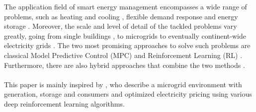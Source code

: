 The application field of smart energy management encompasses a wide range of problems, such as heating  and cooling \cite{Blum.2021}\cite{ThomasSchreiber.2020}, flexible demand response \cite{Jin.2021} and energy storage \cite{Nakabi.2021}. Moreover, the scale and level of detail of the tackled problems vary greatly, going from single buildings \cite{Blum.2021}, to microgrids \cite{Nakabi.2021} \cite{Castellanos.04.12.2022} to eventually continent-wide electricity grids \cite{Horsch.2018}. The two most promising approaches to solve such problems are classical Model Predictive Control (MPC) \cite{Basantes.2023} and Reinforcement Learning (RL) \cite{Nakabi.2021} \cite{Jin.2021} \cite{ThomasSchreiber.2020}\cite{Zhu.2022}. Furthermore, there are also hybrid approaches that combine the two methods \cite{JavierArroyo.2022}.
\\~\\
This paper is mainly inspired by \cite{Nakabi.2021}, who describe a microgrid environment with generation, storage and consumers and optimized electricity pricing
using various deep reinforcement learning algorithms.